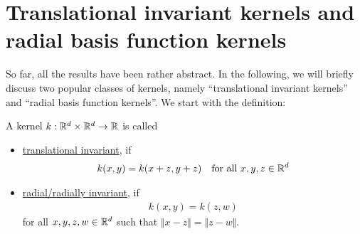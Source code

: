 %
%
%




\section{Translational invariant kernels and radial basis function kernels}


So far, all the results have been rather abstract.
In the following, we will briefly discuss two popular classes of kernels, namely ``translational invariant kernels'' and ``radial basis function kernels''.
We start with the definition:

\begin{definition}
A kernel $k: \mathbb{R}^d \times \mathbb{R}^d \rightarrow \mathbb{R}$ is called 
\begin{itemize}
\item \underline{translational invariant}, if
\begin{align*}
k(x, y) = k(x+z, y+z) \quad \text{for all\ } x, y, z \in \mathbb{R}^d
\end{align*}
\item \underline{radial/radially invariant}, if
\begin{align*}
k(x, y) = k(z, w)
\end{align*}
for all $x, y, z, w \in \mathbb{R}^d$ such that $\Vert x - z \Vert = \Vert z - w \Vert$.
\end{itemize}

\end{definition}

